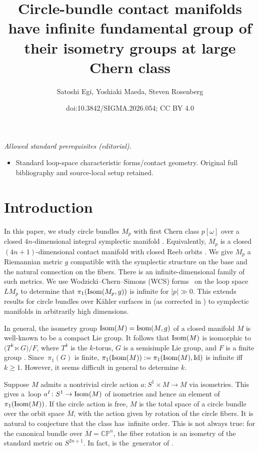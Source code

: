 \documentclass[10pt,a4paper]{amsart}
\title{Circle-bundle contact manifolds have infinite fundamental group of their isometry groups at large Chern class}
\author{Satoshi Egi, Yoshiaki Maeda, Steven Rosenberg}
\date{doi:10.3842/SIGMA.2026.054; CC BY 4.0}
\numberwithin{equation}{section}
\theoremstyle{definition}
\newcommand{\BbP}{{\mathbb P}}
\newcommand{\BbC}{{\mathbb C}}
\newcommand{\BbZ}{{\mathbb Z}}
\newcommand{\Z}{\BbZ}
\newcommand{\bg}{ g}
\newcommand{\bm}{ M}
\newcommand{\ocs}{\widetilde{{\rm CS}}}
\newcommand{\om}{\overline{M}}
\newcommand{\omp}{M_p}
\newcommand{\isom}{{\rm Isom}}
\newcommand{\isombm}{\isom(\bm)}
\begin{document}
\maketitle
\noindent\textit{Allowed standard prerequisites (editorial).}\begin{itemize}
\item Standard loop-space characteristic forms/contact geometry. Original full bibliography and source-local setup retained.
\end{itemize}\medskip
\section{Introduction}

In this paper, we study
circle bundles $\omp$ with first Chern class $p[\omega]$ over a closed $4n$-dimensional integral
symplectic manifold . Equivalently, $\omp$ is a
closed
$(4n+1)$-dimen\-sion\-al contact manifold with closed Reeb orbits \cite[Theorem~3.9]{Blair}. We give $\omp$ a Riemannian metric $\bg$ compatible with the symplectic structure on the base and the natural connection on the fibers. There is an infinite-dimensional family of such metrics.
We use Wodzicki--Chern--Simons (WCS) forms~\smash{$\ocs{}^{\rm W}_{2k-1}$} on the loop space $L\omp$ to determine that
 $\pi_1({\rm Isom}(\omp,\bg))$ is infinite for $|p| \gg 0$. This extends results for circle bundles over K\"ahler surfaces in \cite{MRT4} (as corrected in \cite{MRT4-cor}) to symplectic manifolds in arbitrarily high dimensions.

In general, the isometry group $\isom(\bm) = \isom(\bm,g)$ of a closed manifold $\bm$ is well-known to be a compact Lie group. It follows that $\isom(\bm)$ is isomorphic to
$\bigl(T^k\ltimes G\bigr)/F$, where $T^k$ is the $k$-torus, $G$ is a semisimple Lie group, and $F$ is a finite group \cite[Theorem~6.9]{Bredon}.
Since~$\pi_1(G)$ is finite, $ \pi_1(\isom(\bm)) :=\pi_1(\isom(\bm), {\rm Id}) $
 is infinite iff $k \geq 1$.
However, it seems difficult in general to determine $k$.

Suppose $M$ admits a nontrivial circle action $a\colon S^1\times
M\to M$ via isometries. This gives a~loop $a^I\colon S^1\to \isombm$ of isometries and hence an element of
 $\pi_1(\isombm)$. If the circle action is free, $M$ is the total space of a circle bundle over the orbit space $\om$, with the action given by rotation of the circle fibers. It is natural to conjecture that
 the class \smash{\raisebox{0.2pt}{$\bigl[a^I\bigr]\in \pi_1(\isombm)$}} has~infinite order. This is not always true: for the canonical bundle  over $\overline M = \BbC\BbP^n$,
 the fiber rotation is an isometry of the standard metric on $S^{2n+1}$.
In fact, \smash{$\bigl[a^I\bigr]$} is the~generator of \smash{$\pi_1\bigl(\isom\bigl(S^{2n+1}\bigr)\bigr) = \pi_1({\rm SO}(2n+2))\simeq \Z_2$}.
\end{document}
